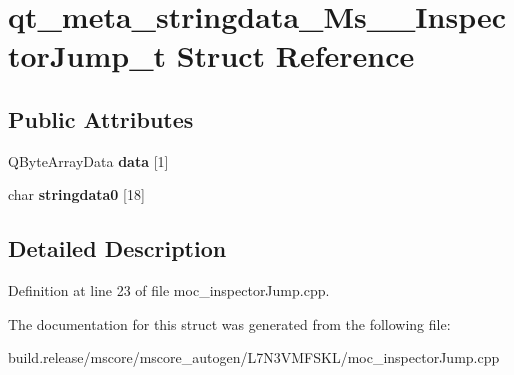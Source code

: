 \hypertarget{structqt__meta__stringdata___ms_____inspector_jump__t}{}\section{qt\+\_\+meta\+\_\+stringdata\+\_\+\+Ms\+\_\+\+\_\+\+Inspector\+Jump\+\_\+t Struct Reference}
\label{structqt__meta__stringdata___ms_____inspector_jump__t}
\subsection*{Public Attributes}
\begin{DoxyCompactItemize}
\item 
\mbox{\label{structqt__meta__stringdata___ms_____inspector_jump__t_a187969be4562df23fc53a81a8a7dfa49}} 
Q\+Byte\+Array\+Data {\bfseries data} \mbox{[}1\mbox{]}
\item 
\mbox{\label{structqt__meta__stringdata___ms_____inspector_jump__t_ac87305a920548995571bbf15eb4e11e6}} 
char {\bfseries stringdata0} \mbox{[}18\mbox{]}
\end{DoxyCompactItemize}


\subsection{Detailed Description}


Definition at line 23 of file moc\+\_\+inspector\+Jump.\+cpp.



The documentation for this struct was generated from the following file\+:\begin{DoxyCompactItemize}
\item 
build.\+release/mscore/mscore\+\_\+autogen/\+L7\+N3\+V\+M\+F\+S\+K\+L/moc\+\_\+inspector\+Jump.\+cpp\end{DoxyCompactItemize}
